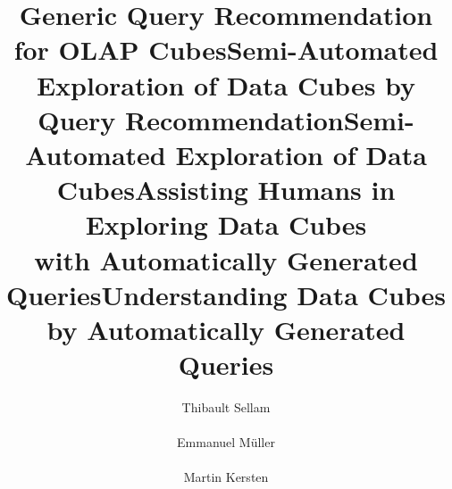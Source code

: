 \documentclass{acm_proc_article-sp}
\begin{document}
\title{Generic Query Recommendation for OLAP Cubes}
\title{Semi-Automated Exploration of Data Cubes by Query Recommendation}
\title{Semi-Automated Exploration of Data Cubes}
\title{Assisting Humans in Exploring Data Cubes\\ with Automatically Generated Queries}
\title{Understanding Data Cubes\\ by Automatically Generated Queries}


\author{
\alignauthor
Thibault Sellam\\
       \\
\alignauthor
Emmanuel M\"uller\\
       \\
\alignauthor
Martin Kersten\\
       \\
}

\maketitle










  
\balancecolumns
\end{document}
